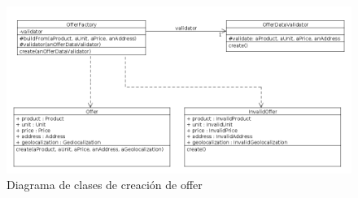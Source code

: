 \begin{figure}[h]
\centerline{\includegraphics[width=0.5\paperwidth]{./imgs/class_diagram_Offer_Factory.png}}
\caption{Diagrama de clases de creaci\'on de offer}
\label{fig:class_Offer_Factory}
\end{figure}

